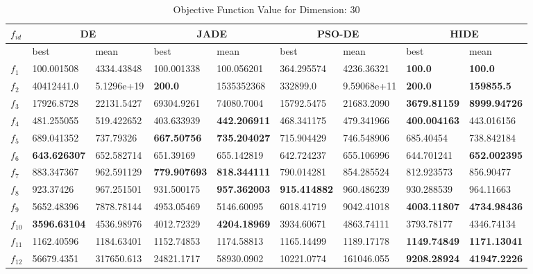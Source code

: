 \begin{table*}[t!]
\centering
\caption{Objective Function Value for Dimension: 30}
 \begin{tabular}{|p{0.8cm}|p{1.6cm}|p{1.6cm}|p{1.6cm}|p{1.6cm}|p{1.6cm}|p{1.6cm}|p{1.6cm}|p{1.6cm}|} 
 \hline
$f_{id}$ & \multicolumn{2}{c|}{DE} & \multicolumn{2}{c|}{JADE} & \multicolumn{2}{c|}{PSO-DE} & \multicolumn{2}{c|}{HIDE} \\
 \hline
    & best & mean & best & mean & best & mean & best & mean \\ [0.5ex] 
 \hline
$f_{1}$ & 100.001508 & 4334.43848 & 100.001338 & 100.056201 & 364.295574 & 4236.36321 & \textbf{100.0} & \textbf{100.0} \\ 
$f_{2}$  & 40412441.0 & 5.1296e+19 & \textbf{200.0} & 1535352368 & 332899.0 & 9.59068e+11 & \textbf{200.0} & \textbf{159855.5} \\ 
$f_{3}$  & 17926.8728 & 22131.5427 & 69304.9261 & 74080.7004 & 15792.5475 & 21683.2090 & \textbf{3679.81159} & \textbf{8999.94726} \\ 
$f_{4}$  & 481.255055 & 519.422652 & 403.633939 & \textbf{442.206911} & 468.341175 & 479.341966 & \textbf{400.004163} & 443.016156 \\ 
$f_{5}$  & 689.041352 & 737.79326 & \textbf{667.50756} & \textbf{735.204027} & 715.904429 & 746.548906 & 685.40454 & 738.842184 \\ 
$f_{6}$  & \textbf{643.626307} & 652.582714 & 651.39169 & 655.142819 & 642.724237 & 655.106996 & 644.701241 & \textbf{652.002395} \\ 
$f_{7}$  & 883.347367 & 962.591129 & \textbf{779.907693} & \textbf{818.344111} & 790.014281 & 854.285524 & 812.923573 & 856.90477 \\ 
$f_{8}$  & 923.37426 & 967.251501 & 931.500175 & \textbf{957.362003} & \textbf{915.414882} & 960.486239 & 930.288539 & 964.11663 \\ 
$f_{9}$  & 5652.48396 & 7878.78144 & 4953.05469 & 5146.60095 & 6018.41719 & 9042.41018 & \textbf{4003.11807} & \textbf{4734.98436} \\ 
$f_{10}$  & \textbf{3596.63104} & 4536.98976 & 4012.72329 & \textbf{4204.18969} & 3934.60671 & 4863.74111 & 3793.78177 & 4346.74134 \\ 
$f_{11}$  & 1162.40596 & 1184.63401 & 1152.74853 & 1174.58813 & 1165.14499 & 1189.17178 & \textbf{1149.74849} & \textbf{1171.13041} \\ 
$f_{12}$  & 56679.4351 & 317650.613 & 24821.1717 & 58930.0902 & 10221.0774 & 161046.055 & \textbf{9208.28924} & \textbf{41947.2226} \\ 

\end{tabular}
\end{table*}
